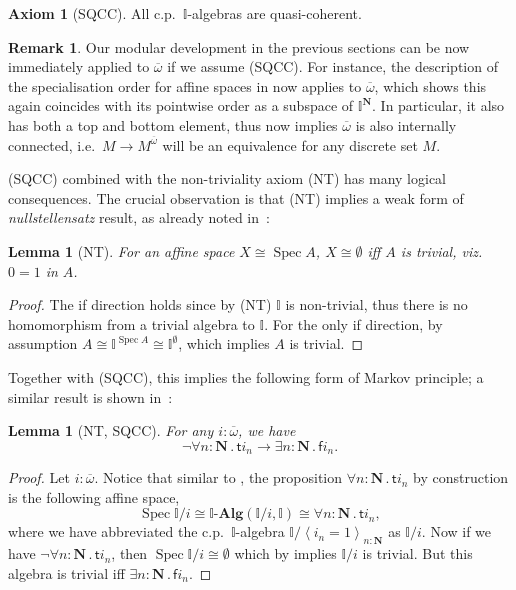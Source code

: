 \documentclass[12pt]{amsart}
\newtheorem{lemma}[theorem]{Lemma}
\theoremstyle{definition}
\newtheorem{remark}[theorem]{Remark}
\newtheorem*{axiom}{Axiom}
\newcommand{\mb}[1]{\mathbf{#1}}
\newcommand{\mbb}[1]{\mathbb{#1}}
\newcommand{\I}{\mbb I}
\newcommand{\ms}[1]{\mathsf{#1}}
\newcommand{\alg}{\text{-}\mb{Alg}}
\newcommand{\ov}[1]{\overline{#1}}
\newcommand{\pair}[1]{\left\langle#1\right\rangle}
\newcommand{\N}{\mb N}
\newcommand{\fa}[2]{\forall #1\!\colon\!\!#2\mathpunct{.}}
\newcommand{\ex}[2]{\exists #1\!\colon\!\!#2\mathpunct{.}}
\newcommand{\emp}{\emptyset}
\newcommand{\spec}{\operatorname{Spec}}
\begin{document}
\begin{axiom}[SQCC]
  All c.p.\ $\I$-algebras are quasi-coherent.
\end{axiom}

\begin{remark}
  Our modular development in the previous sections can be now immediately applied to $\ov\omega$ if we assume (SQCC). For instance, the description of the specialisation order for affine spaces in  now applies to $\ov\omega$, which shows this again coincides with its pointwise order as a subspace of $\I^\N$. In particular, it also has both a top and bottom element, thus  now implies $\ov\omega$ is also internally connected, i.e.\ $M \to M^{\ov\omega}$ will be an equivalence for any discrete set $M$. 
\end{remark}

(SQCC) combined with the non-triviality axiom (NT) has many logical consequences. The crucial observation is that (NT) implies a weak form of \emph{nullstellensatz} result, as already noted in~\cite{blechschmidt2021using,blechschmidt2020general,Cherubini_Coquand_Hutzler_2024}:

\begin{lemma}[NT]\label{lem:nulls}
  For an affine space $X \cong \spec A$, $X \cong \emp$ iff $A$ is trivial, viz. $0=1$ in $A$.
\end{lemma}
\begin{proof}
  The if direction holds since by (NT) $\I$ is non-trivial, thus there is no homomorphism from a trivial algebra to $\I$. For the only if direction, by assumption $A \cong \I^{\spec A} \cong \I^\emp$, which implies $A$ is trivial. 
\end{proof}

Together with (SQCC), this implies the following form of Markov principle; a similar result is shown in~\cite{cherubini2024foundation}:

\begin{lemma}[NT, SQCC]\label{lem:markov}
  For any $i : \ov\omega$, we have
  \[ \neg\fa{n}{\N}\ms ti_n \to \ex n\N\ms fi_n. \]
\end{lemma}
\begin{proof}
  Let $i : \ov\omega$. Notice that similar to , the proposition $\fa n\N \ms ti_n$ by construction is the following affine space, 
  \[ \spec\I/i \cong \I\alg(\I/i,\I) \cong \fa n\N \ms ti_n, \]
  where we have abbreviated the c.p.\ $\I$-algebra $\I/\pair{i_n=1}_{n:\N}$ as $\I/i$. Now if we have $\neg\fa n\N \ms ti_n$, then $\spec\I/i \cong \emp$ which by  implies $\I/i$ is trivial. But this algebra is trivial iff $\ex n\N \ms fi_n$.
\end{proof}
\end{document}
